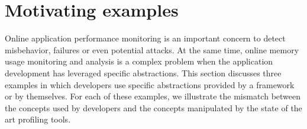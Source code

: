 \section{Motivating examples}\label{sec:motivation}
Online application performance monitoring is an important concern to detect misbehavior, failures or even potential attacks.
At the same time, online memory usage monitoring and analysis is a complex problem when the application development has leveraged specific abstractions. 
This section discusses three examples in which developers use specific abstractions provided by a framework or by themselves. 
For each of these examples, we illustrate the mismatch between the concepts used by developers and the concepts manipulated by the state of the art profiling tools. 


